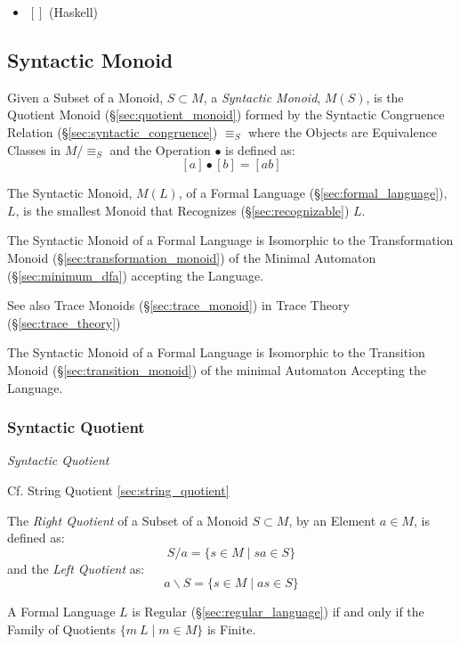 \begin{itemize}
  \item $\mathtt{[]}$ (Haskell)
\end{itemize}



\subsection{Syntactic Monoid}\label{sec:syntactic_monoid}

Given a Subset of a Monoid, $S \subset M$, a \emph{Syntactic Monoid},
$M(S)$, is the Quotient Monoid (\S\ref{sec:quotient_monoid}) formed by
the Syntactic Congruence Relation (\S\ref{sec:syntactic_congruence})
$\equiv_S$ where the Objects are Equivalence Classes in $M / \equiv_S$
and the Operation $\bullet$ is defined as:
\[
  [a] \bullet [b] = [ab]
\]

The Syntactic Monoid, $M(L)$, of a Formal Language
(\S\ref{sec:formal_language}), $L$, is the smallest Monoid that
Recognizes (\S\ref{sec:recognizable}) $L$.

The Syntactic Monoid of a Formal Language is Isomorphic to the
Transformation Monoid (\S\ref{sec:transformation_monoid}) of the
Minimal Automaton (\S\ref{sec:minimum_dfa}) accepting the Language.

\fist See also Trace Monoids (\S\ref{sec:trace_monoid}) in Trace
Theory (\S\ref{sec:trace_theory})

The Syntactic Monoid of a Formal Language is Isomorphic to the
Transition Monoid (\S\ref{sec:transition_monoid}) of the minimal
Automaton Accepting the Language.



\subsubsection{Syntactic Quotient}\label{sec:syntactic_quotient}

\emph{Syntactic Quotient}

\fist Cf. String Quotient \ref{sec:string_quotient}

The \emph{Right Quotient} of a Subset of a Monoid $S \subset M$, by an
Element $a \in M$, is defined as:
\[
  S / a = \{ s \in M\;|\;sa \in S \}
\]
and the \emph{Left Quotient} as:
\[
  a \backslash S = \{ s \in M\;|\;as \in S \}
\]

A Formal Language $L$ is Regular (\S\ref{sec:regular_language}) if and
only if the Family of Quotients $\{ m \ L \;|\; m \in M \}$ is Finite.




